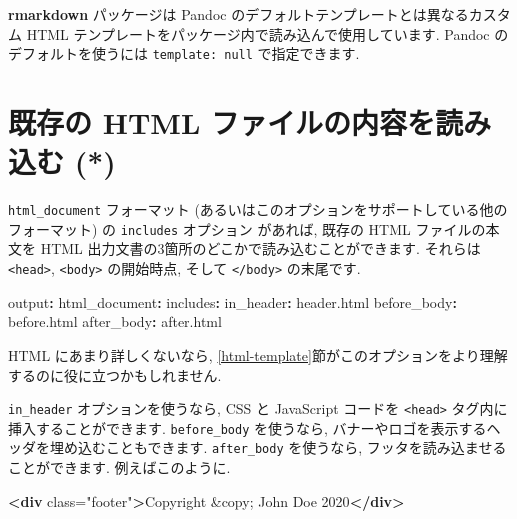 \documentclass[
  11pt,
]{bxjsreport}
\newenvironment{Shaded}{\begin{snugshade}}{\end{snugshade}}
\newcommand{\AttributeTok}[1]{\textcolor[rgb]{0.77,0.63,0.00}{#1}}
\newcommand{\DecValTok}[1]{\textcolor[rgb]{0.00,0.00,0.81}{#1}}
\newcommand{\FunctionTok}[1]{\textcolor[rgb]{0.00,0.00,0.00}{#1}}
\newcommand{\KeywordTok}[1]{\textcolor[rgb]{0.13,0.29,0.53}{\textbf{#1}}}
\newcommand{\NormalTok}[1]{#1}
\newcommand{\OtherTok}[1]{\textcolor[rgb]{0.56,0.35,0.01}{#1}}
\newcommand{\StringTok}[1]{\textcolor[rgb]{0.31,0.60,0.02}{#1}}
\begin{document}
\textbf{rmarkdown} パッケージは Pandoc のデフォルトテンプレートとは異なるカスタム HTML テンプレートをパッケージ内で読み込んで使用しています. Pandoc のデフォルトを使うには \texttt{template: null} で指定できます.

\hypertarget{include-html}{%
\section{既存の HTML ファイルの内容を読み込む (*)}\label{include-html}}

\texttt{html\_document} フォーマット (あるいはこのオプションをサポートしている他のフォーマット) の \texttt{includes} オプション があれば, 既存の HTML ファイルの本文を HTML 出力文書の3箇所のどこかで読み込むことができます. それらは \texttt{\textless{}head\textgreater{}}, \texttt{\textless{}body\textgreater{}} の開始時点, そして \texttt{\textless{}/body\textgreater{}} の末尾です.

\begin{Shaded}
\begin{Highlighting}[]
\FunctionTok{output}\KeywordTok{:}
\AttributeTok{  }\FunctionTok{html\_document}\KeywordTok{:}
\AttributeTok{    }\FunctionTok{includes}\KeywordTok{:}
\AttributeTok{      }\FunctionTok{in\_header}\KeywordTok{:}\AttributeTok{ header.html}
\AttributeTok{      }\FunctionTok{before\_body}\KeywordTok{:}\AttributeTok{ before.html}
\AttributeTok{      }\FunctionTok{after\_body}\KeywordTok{:}\AttributeTok{ after.html}
\end{Highlighting}
\end{Shaded}

HTML にあまり詳しくないなら, \ref{html-template}節がこのオプションをより理解するのに役に立つかもしれません.

\texttt{in\_header} オプションを使うなら, CSS と JavaScript コードを \texttt{\textless{}head\textgreater{}} タグ内に挿入することができます. \texttt{before\_body} を使うなら, バナーやロゴを表示するヘッダを埋め込むこともできます. \texttt{after\_body} を使うなら, フッタを読み込ませることができます. 例えばこのように.

\begin{Shaded}
\begin{Highlighting}[]
\KeywordTok{\textless{}div}\OtherTok{ class=}\StringTok{"footer"}\KeywordTok{\textgreater{}}\NormalTok{Copyright }\DecValTok{\&copy;}\NormalTok{ John Doe 2020}\KeywordTok{\textless{}/div\textgreater{}}
\end{Highlighting}
\end{Shaded}
\end{document}
